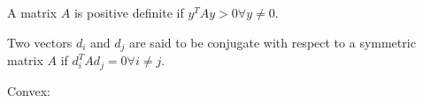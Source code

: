 A matrix $A$ is positive definite if $y^T A y > 0 \forall y \neq 0$.

Two vectors $d_i$ and $d_j$ are said to be
conjugate with respect to a symmetric matrix $A$ if $d_i^T Ad_j = 0 \forall i \neq j$.

Convex: